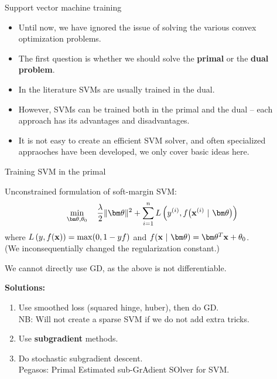 \documentclass[11pt,compress,t,notes=noshow, xcolor=table]{beamer}
\begin{document}

\begin{vbframe}{Support vector machine training}

  \begin{itemize}
    \item Until now, we have ignored the issue of solving the
    various convex optimization problems.
    \item The first question is whether we should solve the \textbf{primal} or the \textbf{dual problem}.
    \item In the literature SVMs are usually trained in the dual.
    \item However, SVMs can be trained both in the primal and the dual -- each approach has its advantages and disadvantages.
    \item It is not easy to create an efficient SVM solver, and often specialized appraoches have been developed, 
      we only cover basic ideas here.
  \end{itemize}

\end{vbframe}

\begin{vbframe}{Training SVM in the primal}

Unconstrained formulation of soft-margin SVM:
$$
\min\limits_{\thetav, \theta_0} \quad \frac{\lambda}{2} \|\thetav\|^2 + \sumin \Lxyit
$$
where $L\left(y, f(\mathbf{x})\right) = \max(0, 1 -  y f)$ and $\fxt = \thetav^T \xv + \theta_0$.\\ 
(We inconsequentially changed the regularization constant.)

\vspace*{2mm}

We cannot directly use GD, as the above is not differentiable.

\vspace*{2mm}

\textbf{Solutions:}
\begin{enumerate}
\item Use smoothed loss (squared hinge, huber), then do GD.\\
  NB: Will not  create a sparse SVM if we do not add extra tricks.
\item Use \textbf{subgradient} methods.
\item Do stochastic subgradient descent.\\
  Pegasos: Primal Estimated sub-GrAdient SOlver for SVM.
\end{enumerate}
\end{vbframe}
\end{document}
